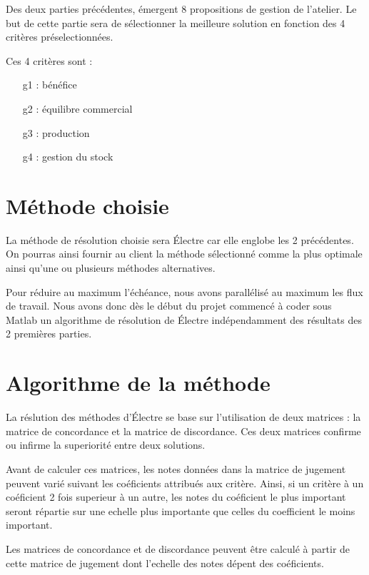 
Des deux parties précédentes, émergent 8 propositions de gestion de l'atelier.
Le but de cette partie sera de sélectionner la meilleure solution en fonction des 4 critères préselectionnées.

Ces 4 critères sont :
\begin{itemize}
\item[g1] : bénéfice
\item[g2] : équilibre commercial
\item[g3] : production
\item[g4] : gestion du stock
\end{itemize}

\section{Méthode choisie}

La méthode de résolution choisie sera Électre  car elle englobe les 2 précédentes.
On pourras ainsi fournir au client la méthode sélectionné comme la plus optimale ainsi qu'une ou plusieurs méthodes alternatives.

Pour réduire au maximum l'échéance, nous avons parallélisé au maximum les flux de travail.
Nous avons donc dès le début du projet commencé à coder sous Matlab un
algorithme de résolution de Électre  indépendamment des résultats des 2 premières parties.

\section{Algorithme de la méthode}

La réslution des méthodes d'Électre se base sur l'utilisation de deux matrices : la matrice de concordance et la matrice de discordance.
Ces deux matrices confirme ou infirme la superiorité entre deux solutions.

Avant de calculer ces matrices, les notes données dans la matrice de jugement peuvent varié suivant les coéficients attribués aux critère. Ainsi, si un critère à un coéficient 2 fois superieur à un autre, les notes du coéficient le plus important seront répartie sur une echelle plus importante que celles du coefficient le moins important.

Les matrices de concordance et de discordance peuvent être calculé à partir de cette matrice de jugement dont l'echelle des notes dépent des coéficients.

